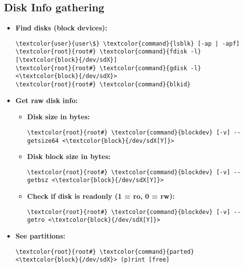 \documentclass[10pt, a4paper, onecolumn, openany]{book} %
\begin{document}
\subsection{Disk Info gathering}
\label{disk_info_gathering}
\begin{itemize}
    \item \textbf{Find disks (block devices):}
\begin{Verbatim}[commandchars=\\\{\}]
\textcolor{user}{user\$} \textcolor{command}{lsblk} [-ap | -apf]
\textcolor{root}{root#} \textcolor{command}{fdisk -l} [\textcolor{block}{/dev/sdX}]
\textcolor{root}{root#} \textcolor{command}{gdisk -l} <\textcolor{block}{/dev/sdX}>
\textcolor{root}{root#} \textcolor{command}{blkid}
\end{Verbatim}
    \item \textbf{Get raw disk info:}
    \begin{itemize}
        \item \textbf{Disk size in bytes:}
\begin{Verbatim}[commandchars=\\\{\}]
\textcolor{root}{root#} \textcolor{command}{blockdev} [-v] --getsize64 <\textcolor{block}{/dev/sdX[Y]}>
\end{Verbatim}        
    \item \textbf{Disk block size in bytes:}
\begin{Verbatim}[commandchars=\\\{\}]
\textcolor{root}{root#} \textcolor{command}{blockdev} [-v] --getbsz <\textcolor{block}{/dev/sdX[Y]}>
\end{Verbatim}
    \item \textbf{Check if disk is readonly (1 = ro, 0 = rw):}
\begin{Verbatim}[commandchars=\\\{\}]
\textcolor{root}{root#} \textcolor{command}{blockdev} [-v] --getro <\textcolor{block}{/dev/sdX[Y]}>
\end{Verbatim}
    \end{itemize}
    \item \textbf{See partitions:}
\begin{Verbatim}[commandchars=\\\{\}]
\textcolor{root}{root#} \textcolor{command}{parted} <\textcolor{block}{/dev/sdX}> (p)rint [free]
\end{Verbatim}
\end{itemize}
\end{document}
